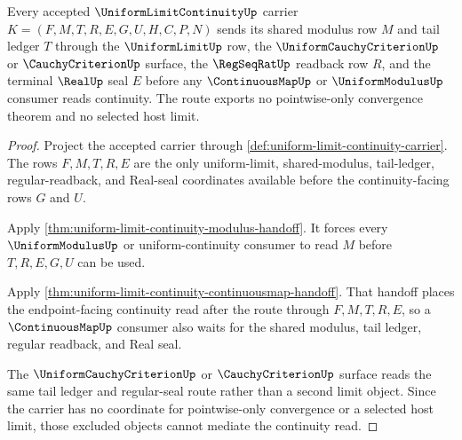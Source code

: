 \begin{theorem}
\label{thm:uniform-limit-continuity-cauchy-criterion-handoff}
Every accepted $\UniformLimitContinuityUp$ carrier $K=(F,M,T,R,E,G,U,H,C,P,N)$ sends its shared modulus row $M$ and tail ledger $T$ through the $\UniformLimitUp$ row, the $\UniformCauchyCriterionUp$ or $\CauchyCriterionUp$ surface, the $\RegSeqRatUp$ readback row $R$, and the terminal $\RealUp$ seal $E$ before any $\ContinuousMapUp$ or $\UniformModulusUp$ consumer reads continuity. The route exports no pointwise-only convergence theorem and no selected host limit.
\end{theorem}
\begin{proof}
Project the accepted carrier through \autoref{def:uniform-limit-continuity-carrier}. The rows $F,M,T,R,E$ are the only uniform-limit, shared-modulus, tail-ledger, regular-readback, and Real-seal coordinates available before the continuity-facing rows $G$ and $U$.

Apply \autoref{thm:uniform-limit-continuity-modulus-handoff}. It forces every $\UniformModulusUp$ or uniform-continuity consumer to read $M$ before $T,R,E,G,U$ can be used.

Apply \autoref{thm:uniform-limit-continuity-continuousmap-handoff}. That handoff places the endpoint-facing continuity read after the route through $F,M,T,R,E$, so a $\ContinuousMapUp$ consumer also waits for the shared modulus, tail ledger, regular readback, and Real seal.

The $\UniformCauchyCriterionUp$ or $\CauchyCriterionUp$ surface reads the same tail ledger and regular-seal route rather than a second limit object. Since the carrier has no coordinate for pointwise-only convergence or a selected host limit, those excluded objects cannot mediate the continuity read.
\end{proof}

